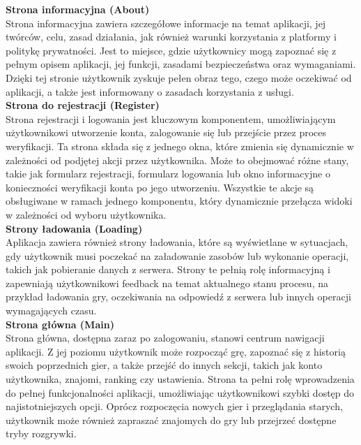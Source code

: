 \documentclass[12pt,a4paper]{article}
\begin{document}
\noindent \textbf{Strona informacyjna (About)}\\
Strona informacyjna zawiera szczegółowe informacje na temat aplikacji, jej twórców, celu, zasad działania, jak również warunki korzystania z platformy i politykę prywatności. Jest to miejsce, gdzie użytkownicy mogą zapoznać się z pełnym opisem aplikacji, jej funkcji, zasadami bezpieczeństwa oraz wymaganiami. Dzięki tej stronie użytkownik zyskuje pełen obraz tego, czego może oczekiwać od aplikacji, a także jest informowany o zasadach korzystania z usługi.
\\

\noindent \textbf{Strona do rejestracji (Register)}\\
Strona rejestracji i logowania jest kluczowym komponentem, umożliwiającym użytkownikowi utworzenie konta, zalogowanie się lub przejście przez proces weryfikacji. Ta strona składa się z jednego okna, które zmienia się dynamicznie w zależności od podjętej akcji przez użytkownika. Może to obejmować różne stany, takie jak formularz rejestracji, formularz logowania lub okno informacyjne o konieczności weryfikacji konta po jego utworzeniu. Wszystkie te akcje są obsługiwane w ramach jednego komponentu, który dynamicznie przełącza widoki w zależności od wyboru użytkownika.
\\

\noindent \textbf{Strony ładowania (Loading)}\\
Aplikacja zawiera również strony ładowania, które są wyświetlane w sytuacjach, gdy użytkownik musi poczekać na załadowanie zasobów lub wykonanie operacji, takich jak pobieranie danych z serwera. Strony te pełnią rolę informacyjną i zapewniają użytkownikowi feedback na temat aktualnego stanu procesu, na przykład ładowania gry, oczekiwania na odpowiedź z serwera lub innych operacji wymagających czasu.
\\

\noindent \textbf{Strona główna (Main)}\\
Strona główna, dostępna zaraz po zalogowaniu, stanowi centrum nawigacji aplikacji. Z jej poziomu użytkownik może rozpocząć grę, zapoznać się z historią swoich poprzednich gier, a także przejść do innych sekcji, takich jak konto użytkownika, znajomi, ranking czy ustawienia. Strona ta pełni rolę wprowadzenia do pełnej funkcjonalności aplikacji, umożliwiając użytkownikowi szybki dostęp do najistotniejszych opcji. Oprócz rozpoczęcia nowych gier i przeglądania starych, użytkownik może również zapraszać znajomych do gry lub przejrzeć dostępne tryby rozgrywki.
\\
\end{document}
